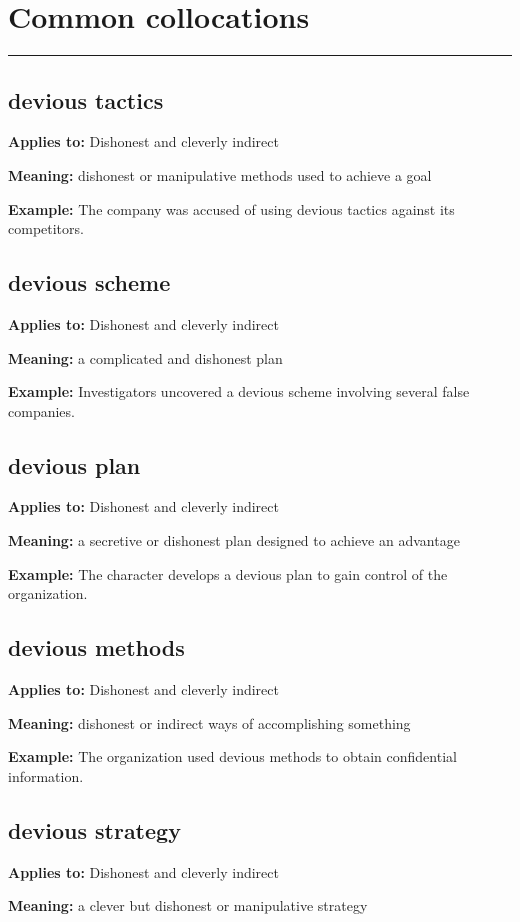 \documentclass[11pt]{article}
\newcommand{\sectionrule}{\par\vspace{-0.5em}\noindent\textcolor{Accent}{\rule{\linewidth}{0.6pt}}\par}
\begin{document}
\section{Common collocations}
\sectionrule
\subsection{devious tactics}
\textbf{Applies to:} Dishonest and cleverly indirect

\textbf{Meaning:} dishonest or manipulative methods used to achieve a goal

\textbf{Example:} The company was accused of using devious tactics against its competitors.

\subsection{devious scheme}
\textbf{Applies to:} Dishonest and cleverly indirect

\textbf{Meaning:} a complicated and dishonest plan

\textbf{Example:} Investigators uncovered a devious scheme involving several false companies.

\subsection{devious plan}
\textbf{Applies to:} Dishonest and cleverly indirect

\textbf{Meaning:} a secretive or dishonest plan designed to achieve an advantage

\textbf{Example:} The character develops a devious plan to gain control of the organization.

\subsection{devious methods}
\textbf{Applies to:} Dishonest and cleverly indirect

\textbf{Meaning:} dishonest or indirect ways of accomplishing something

\textbf{Example:} The organization used devious methods to obtain confidential information.

\subsection{devious strategy}
\textbf{Applies to:} Dishonest and cleverly indirect

\textbf{Meaning:} a clever but dishonest or manipulative strategy
\end{document}
